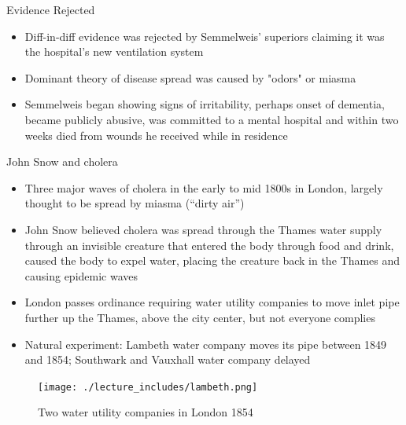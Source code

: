 \documentclass{beamer}
\begin{document}
\begin{frame}{Evidence Rejected}

\begin{itemize}

\item Diff-in-diff evidence was rejected by Semmelweis' superiors claiming it was the hospital's new ventilation system
\item Dominant theory of disease spread was caused by "odors" or miasma
\item Semmelweis began showing signs of irritability, perhaps onset of dementia, became publicly abusive, was committed to a mental hospital and within two weeks died from wounds he received while in residence

\end{itemize}

\end{frame}






\begin{frame}{John Snow and cholera}

\begin{itemize}
\item Three major waves of cholera in the early to mid 1800s in London, largely thought to be spread by miasma (``dirty air'')
\item John Snow believed cholera was spread through the Thames water supply through an invisible creature that entered the body through food and drink, caused the body to expel water, placing the creature back in the Thames and causing epidemic waves
\item London passes ordinance requiring water utility companies to move inlet pipe further up the Thames, above the city center, but not everyone complies
\item Natural experiment: Lambeth water company moves its pipe between 1849 and 1854; Southwark and Vauxhall water company delayed
\end{itemize}

\end{frame}


\begin{frame}

	\begin{figure}
	\caption{Two water utility companies in London 1854}
	\texttt{[image: ./lecture\_includes/lambeth.png]}
	\end{figure}


\end{frame}
\end{document}
